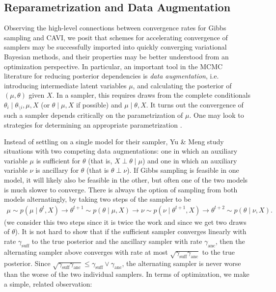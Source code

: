 \documentclass{article}
\begin{document}
\newpage

\subsection{Reparametrization and Data Augmentation} 

Observing the high-level connections between convergence rates for Gibbs sampling and CAVI, we posit that schemes for accelerating convergence of samplers may be successfully imported into quickly converging variational Bayesian methods, and their properties may be better understood from an optimization perspective. In particular, an important tool in the MCMC literature for reducing posterior dependencies is {\sl data augmentation}, i.e. introducing intermediate latent variables $\mu$, and calculating the posterior of $(\mu,\theta)$ given $X$. In a sampler, this requires draws from the complete conditionals $\theta_i \mid \theta_{\setminus i},\mu,X$ (or $\theta\mid \mu,X$ if possible) and $\mu \mid \theta,X$. It turns out the convergence of such a sampler depends critically on the parametrization of $\mu$. One may look to strategies for determining an appropriate parametrization \cite{Papaspiliopoulos}. 


Instead of settling on a single model for their sampler, Yu \& Meng \cite{Yu} study situations with two competing data augmentations: one in which an auxiliary variable $\mu$ is sufficient for $\theta$ (that is, $X\perp\theta\mid \mu$) and one in which an auxiliary variable $\nu$ is ancillary for $\theta$ (that is $\theta\perp \nu$). If Gibbs sampling is feasible in one model, it will likely also be feasible in the other, but often one of the two models is much slower to converge. There is always the option of sampling from both models alternatingly, by taking two steps of the sampler to be
\begin{align}
\mu\sim p(\mu \mid \theta^t,X) \to \theta^{t+1}\sim p(\theta \mid \mu,X) \to \nu\sim p(\nu\mid \theta^{t+1},X) \to \theta^{t+2}\sim p(\theta\mid \nu, X).
\end{align}
(we consider this two steps since it is twice the work and since we get two draws of $\theta$). It is not hard to show that if the sufficient sampler converges linearly with rate $\gamma_{\text{suff}}$ to the true posterior and the ancillary sampler with rate $\gamma_{\text{anc}}$, then the alternating sampler above converges with rate at most $\sqrt{\gamma_{\text{suff}}\gamma_{\text{anc}}}$ to the true posterior. Since $\sqrt{\gamma_{\text{suff}}\gamma_{\text{anc}}} \le \gamma_{\text{suff}}\lor\gamma_{\text{anc}}$, the alternating sampler is never worse than the worse of the two individual samplers. In terms of optimization, we make a simple, related observation: 
\end{document}
